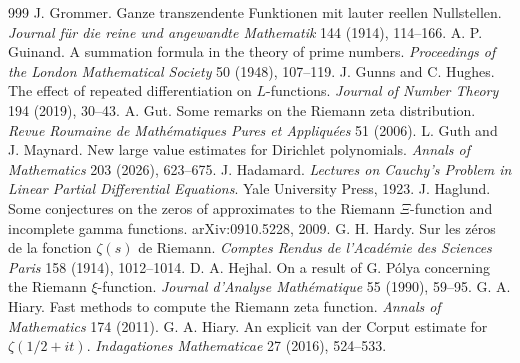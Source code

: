 \begin{thebibliography}{999}
 J. Grommer. Ganze transzendente Funktionen mit lauter reellen Nullstellen. \emph{Journal f\"ur die reine und angewandte Mathematik} 144 (1914), 114--166.
 A. P. Guinand. A summation formula in the theory of prime numbers. \emph{Proceedings of the London Mathematical Society} 50 (1948), 107--119.
 J. Gunns and C. Hughes. The effect of repeated differentiation on $L$-functions. \emph{Journal of Number Theory} 194 (2019), 30--43.
 A. Gut. Some remarks on the Riemann zeta distribution. \emph{Revue Roumaine de Math\'ematiques Pures et Appliqu\'ees} 51 (2006).
 L. Guth and J. Maynard. New large value estimates for Dirichlet polynomials. \emph{Annals of Mathematics} 203 (2026), 623--675.
 J. Hadamard. \emph{Lectures on Cauchy's Problem in Linear Partial Differential Equations}. Yale University Press, 1923.
 J. Haglund. Some conjectures on the zeros of approximates to the Riemann $\Xi$-function and incomplete gamma functions. arXiv:0910.5228, 2009.
 G. H. Hardy. Sur les z\'eros de la fonction $\zeta(s)$ de Riemann. \emph{Comptes Rendus de l'Acad\'emie des Sciences Paris} 158 (1914), 1012--1014.
 D. A. Hejhal. On a result of G. P\'olya concerning the Riemann $\xi$-function. \emph{Journal d'Analyse Math\'ematique} 55 (1990), 59--95.
 G. A. Hiary. Fast methods to compute the Riemann zeta function. \emph{Annals of Mathematics} 174 (2011).
 G. A. Hiary. An explicit van der Corput estimate for $\zeta(1/2+it)$. \emph{Indagationes Mathematicae} 27 (2016), 524--533.

\end{thebibliography}
